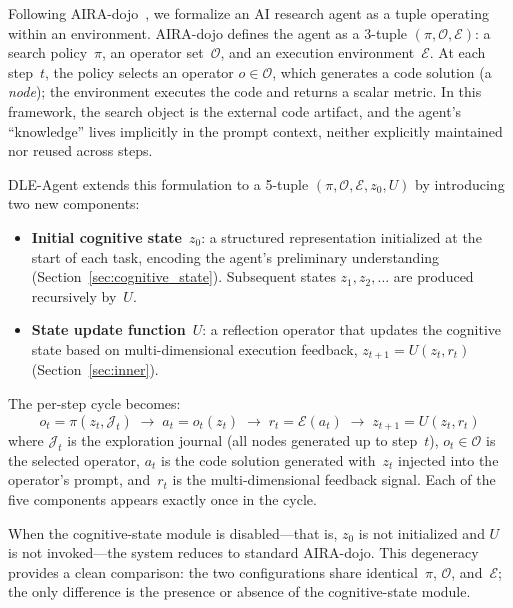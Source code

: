 \documentclass{article} %
\newcommand{\zt}{z_t}
\newcommand{\ztnext}{z_{t+1}}
\newcommand{\rt}{r_t}
\begin{document}
Following AIRA-dojo~\citep{airadojo2025}, we formalize an AI research agent as
a tuple operating within an environment. AIRA-dojo defines the agent as a
3-tuple $(\pi, \mathcal{O}, \mathcal{E})$: a search policy~$\pi$, an operator
set~$\mathcal{O}$, and an execution environment~$\mathcal{E}$. At each
step~$t$, the policy selects an operator $o \in \mathcal{O}$, which generates a
code solution (a \emph{node}); the environment executes the code and returns a
scalar metric. In this framework, the search object is the external code
artifact, and the agent's ``knowledge'' lives implicitly in the prompt context,
neither explicitly maintained nor reused across steps.

DLE-Agent extends this formulation to a 5-tuple
$(\pi, \mathcal{O}, \mathcal{E}, z_0, U)$ by introducing two new components:
\begin{itemize}
  \item \textbf{Initial cognitive state}~$z_0$: a structured representation
  initialized at the start of each task, encoding the agent's preliminary
  understanding (Section~\ref{sec:cognitive_state}). Subsequent states
  $z_1, z_2, \ldots$ are produced recursively by~$U$.
  \item \textbf{State update function}~$U$: a reflection operator that updates
  the cognitive state based on multi-dimensional execution feedback,
  $\ztnext = U(\zt, \rt)$ (Section~\ref{sec:inner}).
\end{itemize}

The per-step cycle becomes:
\begin{equation}
  o_t = \pi(\zt, \mathcal{J}_t) \;\longrightarrow\;
  a_t = o_t(\zt) \;\longrightarrow\;
  \rt = \mathcal{E}(a_t) \;\longrightarrow\;
  \ztnext = U(\zt, \rt)
  \label{eq:cycle}
\end{equation}
where $\mathcal{J}_t$ is the exploration journal (all nodes generated up to
step~$t$), $o_t \in \mathcal{O}$ is the selected operator, $a_t$ is the code
solution generated with~$\zt$ injected into the operator's prompt, and~$\rt$ is
the multi-dimensional feedback signal. Each of the five components appears
exactly once in the cycle.

When the cognitive-state module is disabled---that is, $z_0$ is not
initialized and $U$ is not invoked---the system reduces to standard AIRA-dojo.
This degeneracy provides a clean comparison: the two configurations share
identical~$\pi$, $\mathcal{O}$, and~$\mathcal{E}$; the only difference is the
presence or absence of the cognitive-state module.
\end{document}
